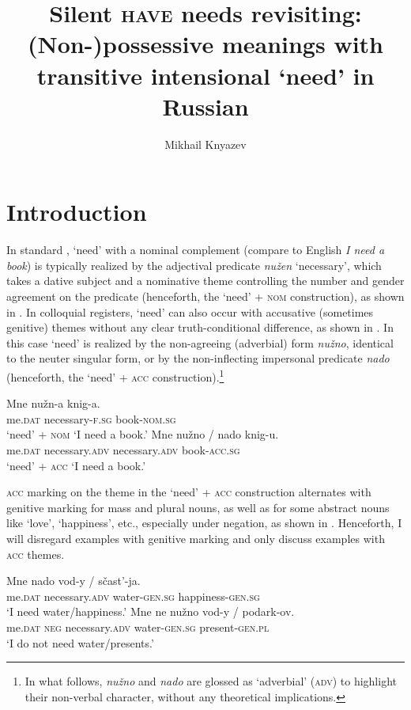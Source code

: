 \documentclass[output=paper]{langscibook}
\author{Mikhail Knyazev\affiliation{Institute for Linguistic Studies RAS, Saint Petersburg}\affiliation{National Research University Higher School of Economics, Saint Petersburg}\orcid{0000-0003-4652-4144}}
\title[Silent \textsc{have} needs revisiting]
      {Silent \textsc{have} needs revisiting: (Non-)possessive meanings with transitive intensional `need' in Russian}
\begin{document}
\maketitle

\section{Introduction}\label{section-intro}

In standard , `need' with a nominal complement (compare to English \textit{I need a book}) is typically realized by the adjectival predicate \textit{nužen} `necessary', which takes a dative subject and a nominative theme controlling the number and gender agreement on the predicate (henceforth, the `need' + \textsc{nom} construction), as shown in . In colloquial registers, `need' can also occur with accusative (sometimes genitive) themes without any clear truth-conditional difference, as shown in . In this case `need' is realized by the non-agreeing (adverbial) form \textit{nužno}, identical to the neuter singular form, or by the non-inflecting impersonal predicate \textit{nado} (henceforth, the `need' + \textsc{acc} construction).\footnote{In what follows, \textit{nužno} and \textit{nado} are glossed as `adverbial' (\textsc{adv}) to highlight their non-verbal character, without any theoretical implications.}

\ea
\ea \gll Mne nužn-a knig-a.\\
     me.\textsc{dat} necessary-\textsc{f.sg} book-\textsc{nom.sg}\\ \hfill `need' + \textsc{nom}
\glt `I need a book.'\label{need-nom}
\ex \gll Mne nužno / nado knig-u.\\
     me.\textsc{dat} necessary.\textsc{adv} {} necessary.\textsc{adv} book-\textsc{acc.sg}\\ \hfill `need' + \textsc{acc}
\glt `I need a book.'\label{need-acc}
\z \z

\noindent \textsc{acc} marking on the theme in the `need' + \textsc{acc} construction alternates with genitive marking for mass and plural nouns, as well as for some abstract nouns like `love', `happiness', etc., especially under negation, as shown in . Henceforth, I will disregard examples with genitive marking and only discuss examples with \textsc{acc} themes.

\ea\label{need-gen}
\ea \gll Mne nado vod-y / sčast'-ja.\\
     me.\textsc{dat} necessary.\textsc{adv} water-\textsc{gen.sg} {} happiness-\textsc{gen.sg}\\
\glt `I need water/happiness.'
\ex \gll Mne ne nužno vod-y / podark-ov.\\
     me.\textsc{dat} \textsc{neg} necessary.\textsc{adv} water-\textsc{gen.sg}  {} present-\textsc{gen.pl}\\
\glt `I do not need water/presents.'
\z\z
\end{document}
